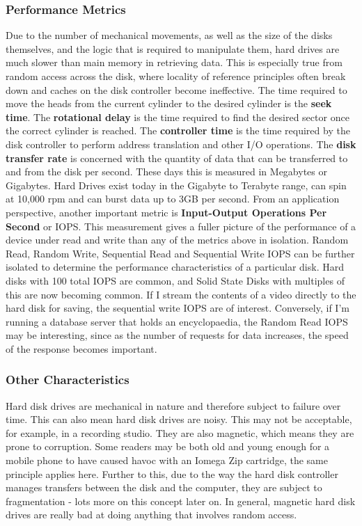 \documentclass[10pt,a4paper]{article}
\begin{document}
\subsubsection{Performance Metrics}
Due to the number of mechanical movements, as well as the size of the disks themselves, and the logic that is required to manipulate them, hard drives are much slower than main memory in retrieving data. This is especially true from random access across the disk, where locality of reference principles often break down and caches on the disk controller become ineffective. \newline\newline The time required to move the heads from the current cylinder to the desired cylinder is the {\bf seek time}. The {\bf rotational delay} is the time required to find the desired sector once the correct cylinder is reached. The {\bf controller time} is the time required by the disk controller to perform address translation and other I/O operations. The {\bf disk transfer rate} is concerned with the quantity of data that can be transferred to and from the disk per second. These days this is measured in Megabytes or Gigabytes. Hard Drives exist today in the Gigabyte to Terabyte range, can spin at 10,000 rpm and can burst data up to 3GB per second. \newline\newline
From an application perspective, another important metric is {\bf Input-Output Operations Per Second} or IOPS. This measurement gives a fuller picture of the performance of a device under read and write than any of the metrics above in isolation. Random Read, Random Write, Sequential Read and Sequential Write IOPS can be further isolated to determine the performance characteristics of a particular disk. Hard disks with 100 total IOPS are common, and Solid State Disks with multiples of this are now becoming common. If I stream the contents of a video directly to the hard disk for saving, the sequential write IOPS are of interest. Conversely, if I'm running a database server that holds an encyclopaedia, the Random Read IOPS may be interesting, since as the number of requests for data increases, the speed of the response becomes important. 
\subsubsection{Other Characteristics}
Hard disk drives are mechanical in nature and therefore subject to failure over time. This can also mean hard disk drives are noisy. This may not be acceptable, for example, in a recording studio. They are also magnetic, which means they are prone to corruption. Some readers may be both old and young enough for a mobile phone to have caused havoc with an Iomega Zip cartridge, the same principle applies here. Further to this, due to the way the hard disk controller manages transfers between the disk and the computer, they are subject to fragmentation - lots more on this concept later on. In general, magnetic hard disk drives are really bad at doing anything that involves random access. 
\end{document}
